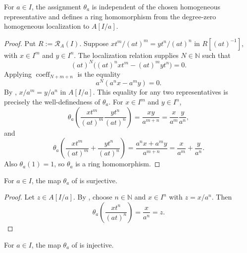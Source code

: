 \begin{lemma}
  \label{lemma:nagata-homogeneous-away-to-chart}
  \lean{}

  For $a\in I$, the assignment $\theta_a$ is independent of the chosen homogeneous
  representative and defines a ring homomorphism from the degree-zero
  homogeneous localization to $A[I/a]$.
\end{lemma}

\begin{proof}
  Put $R:=\mathcal R_A(I)$.  Suppose
  $xt^m/(at)^m=yt^n/(at)^n$ in $R[(at)^{-1}]$, with
  $x\in I^m$ and $y\in I^n$.  The localization relation supplies
  $N\in\mathbb N$ such that
  \[
    (at)^N\bigl((at)^nxt^m-(at)^myt^n\bigr)=0.
  \]
  Applying $\operatorname{coeff}_{N+m+n}$ is the equality
  \[
    a^N(a^nx-a^my)=0.
  \]
  By ,
  $x/a^m=y/a^n$ in $A[I/a]$.  This equality for any two representatives is
  precisely the well-definedness of $\theta_a$.  For
  $x\in I^m$ and $y\in I^n$,
  \[
    \theta_a\!\left(\frac{xt^m}{(at)^m}
      \frac{yt^n}{(at)^n}\right)
      =\frac{xy}{a^{m+n}}
      =\frac{x}{a^m}\frac{y}{a^n},
  \]
  and
  \[
    \theta_a\!\left(\frac{xt^m}{(at)^m}
      +\frac{yt^n}{(at)^n}\right)
      =\frac{a^nx+a^my}{a^{m+n}}
      =\frac{x}{a^m}+\frac{y}{a^n}.
  \]
  Also $\theta_a(1)=1$, so $\theta_a$ is a ring homomorphism.
\end{proof}

\begin{lemma}
  \label{lemma:nagata-homogeneous-away-to-chart-surjective}
  \lean{}

  For $a\in I$, the map $\theta_a$ of
   is
  surjective.
\end{lemma}

\begin{proof}
  Let $z\in A[I/a]$.  By
  , choose $n\in\mathbb N$ and
  $x\in I^n$ with $z=x/a^n$.  Then
  \[
    \theta_a\!\left(\frac{xt^n}{(at)^n}\right)=\frac{x}{a^n}=z.
  \]
\end{proof}

\begin{lemma}
  \label{lemma:nagata-homogeneous-away-to-chart-injective}
  \lean{}

  For $a\in I$, the map $\theta_a$ of
   is
  injective.
\end{lemma}

